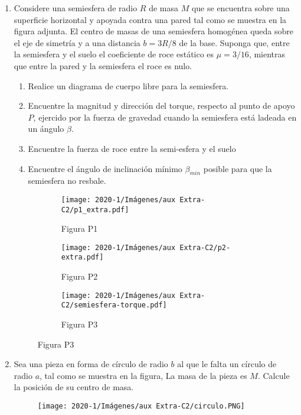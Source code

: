 \documentclass[letterpaper,11pt]{article}
\begin{document}
\begin{enumerate}
\item Considere una semiesfera de radio $R$ de masa $M$ que se encuentra sobre una superficie horizontal y apoyada contra una pared tal como se muestra en la figura adjunta. El centro de masas de una semiesfera homogénea queda sobre el eje de simetría y a una distancia ${b} = 3 R / 8$ de la base. Suponga que, entre la semiesfera y el suelo el coeficiente de roce estático es $\mu = 3 / 16$, mientras que entre la pared y la semiesfera el roce es nulo.
    \begin{enumerate}
        \item Realice un diagrama de cuerpo libre para la semiesfera.
        \item Encuentre la magnitud y dirección del torque, respecto al punto de apoyo $P$, ejercido por la fuerza de gravedad cuando la semiesfera está ladeada en un ángulo $\beta$.
        \item Encuentre la fuerza de roce entre la semi-esfera y el suelo
        \item Encuentre el ángulo de inclinación mínimo $\beta_{min}$ posible para que la semiesfera no resbale.
    \end{enumerate}
    \begin{figure}[h!]
        \centering
        \begin{subfigure}[t]{5.4cm}
            \centering
            \texttt{[image: 2020-1/Imágenes/aux Extra-C2/p1\_extra.pdf]}
            \caption*{Figura P1}
        \end{subfigure}
        \qquad 
        \begin{subfigure}[t]{5.4cm}
            \centering
            \texttt{[image: 2020-1/Imágenes/aux Extra-C2/p2-extra.pdf]}
            \caption*{Figura P2}
        \end{subfigure}
        \begin{subfigure}[t]{5.4cm}
            \centering
            \texttt{[image: 2020-1/Imágenes/aux Extra-C2/semiesfera-torque.pdf]}
            \caption*{Figura P3}
        \end{subfigure}
    \end{figure}
\newpage
\item Sea una pieza en forma de círculo de radio $b$ al que le falta un círculo de radio $a$, tal como se muestra en la figura, La masa de la pieza es $M$. Calcule la posición de su centro de masa.

\begin{figure}[h!]
    \centering
    \texttt{[image: 2020-1/Imágenes/aux Extra-C2/circulo.PNG]}
\end{figure}


\end{enumerate}
\end{document}
